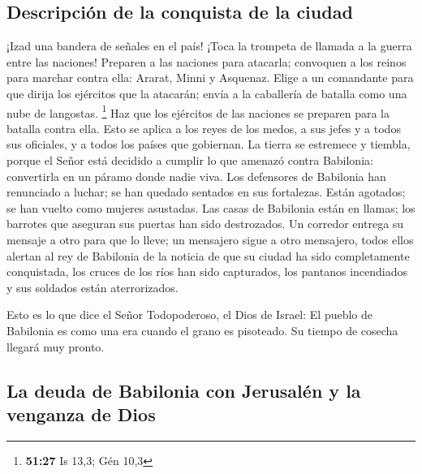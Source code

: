 \hypertarget{descripciuxf3n-de-la-conquista-de-la-ciudad}{%
\subsection{Descripción de la conquista de la
ciudad}\label{descripciuxf3n-de-la-conquista-de-la-ciudad}}

 ¡Izad una bandera de señales en el país! ¡Toca la
trompeta de llamada a la guerra entre las naciones! Preparen a las
naciones para atacarla; convoquen a los reinos para marchar contra ella:
Ararat, Minni y Asquenaz. Elige a un comandante para que dirija los
ejércitos que la atacarán; envía a la caballería de batalla como una
nube de langostas. \footnote{\textbf{51:27} Is 13,3; Gén 10,3}
 Haz que los ejércitos de las naciones se preparen para
la batalla contra ella. Esto se aplica a los reyes de los medos, a sus
jefes y a todos sus oficiales, y a todos los países que gobiernan.
 La tierra se estremece y tiembla, porque el Señor está
decidido a cumplir lo que amenazó contra Babilonia: convertirla en un
páramo donde nadie viva.  Los defensores de Babilonia han
renunciado a luchar; se han quedado sentados en sus fortalezas. Están
agotados; se han vuelto como mujeres asustadas. Las casas de Babilonia
están en llamas; los barrotes que aseguran sus puertas han sido
destrozados.  Un corredor entrega su mensaje a otro para
que lo lleve; un mensajero sigue a otro mensajero, todos ellos alertan
al rey de Babilonia de la noticia de que su ciudad ha sido completamente
conquistada,  los cruces de los ríos han sido capturados,
los pantanos incendiados y sus soldados están aterrorizados.

 Esto es lo que dice el Señor Todopoderoso, el Dios de
Israel: El pueblo de Babilonia es como una era cuando el grano es
pisoteado. Su tiempo de cosecha llegará muy pronto.

\hypertarget{la-deuda-de-babilonia-con-jerusaluxe9n-y-la-venganza-de-dios}{%
\subsection{La deuda de Babilonia con Jerusalén y la venganza de
Dios}\label{la-deuda-de-babilonia-con-jerusaluxe9n-y-la-venganza-de-dios}}

